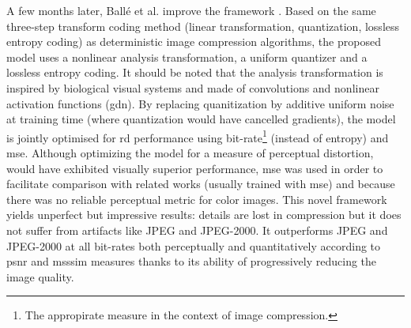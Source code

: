 A few months later, Ballé et al. improve the framework \cite{ballé2017endtoendoptimizedimagecompression}. Based on the same three-step transform coding method (linear transformation, quantization, lossless entropy coding) as deterministic image compression algorithms, the proposed model uses a nonlinear analysis transformation, a uniform quantizer and a lossless entropy coding. It should be noted that the analysis transformation is inspired by biological visual systems and made of convolutions and nonlinear activation functions (\acrshort{gdn}). By replacing quanitization by additive uniform noise at training time (where quantization would have cancelled gradients), the model is jointly optimised for \acrshort{rd} performance using bit-rate\footnote{The appropirate measure in the context of image compression.} (instead of entropy) and \acrshort{mse}. Although optimizing the model for a measure of perceptual distortion, would have exhibited visually superior performance, \acrshort{mse} was used in order to facilitate comparison with related works (usually trained with \acrshort{mse}) and because there was no reliable perceptual metric for color images. This novel framework yields unperfect but impressive results: details are lost in compression but it does not suffer from artifacts like JPEG and JPEG-2000. It outperforms JPEG and JPEG-2000 at all bit-rates both perceptually and quantitatively according to \acrshort{psnr} and \acrshort{msssim} measures thanks to its ability of progressively reducing the image quality.

